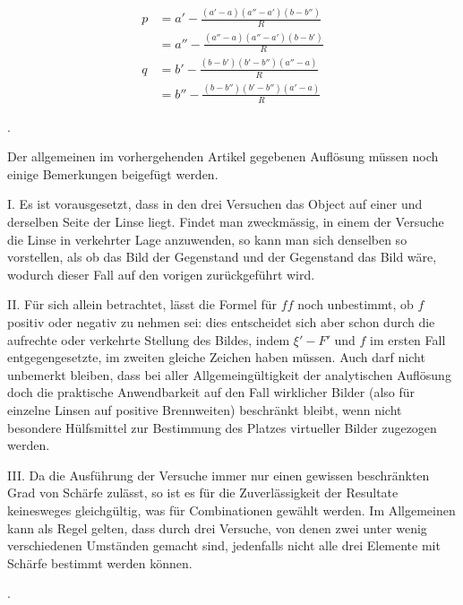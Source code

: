 \documentclass[11pt,a4paper]{article}
\begin{document}
\newpage
\noindent
\begin{align*}
p &= a' - \frac{(a' - a)(a'' - a')(b - b'')}{R} \\
  &= a'' - \frac{(a'' - a)(a'' - a')(b - b')}{R} \\
q &= b' - \frac{(b - b')(b' - b'')(a'' - a)}{R} \\
  &= b'' - \frac{(b - b'')(b' - b'')(a' - a)}{R}
\end{align*}

\bigskip{}.

\smallskip
Der allgemeinen im vorhergehenden Artikel gegebenen Auflösung müssen noch einige Bemerkungen beigefügt werden.

I. Es ist vorausgesetzt, dass in den drei Versuchen das Object auf einer und derselben Seite der Linse liegt. Findet man zweckmässig, in einem der Versuche die Linse in verkehrter Lage anzuwenden, so kann man sich denselben so vorstellen, als ob das Bild der Gegenstand und der Gegenstand das Bild wäre, wodurch dieser Fall auf den vorigen zurückgeführt wird.

II. Für sich allein betrachtet, lässt die Formel für $ff$ noch unbestimmt, ob $f$ positiv oder negativ zu nehmen sei: dies entscheidet sich aber schon durch die aufrechte oder verkehrte Stellung des Bildes, indem $\xi' - F'$ und $f$ im ersten Fall entgegengesetzte, im zweiten gleiche Zeichen haben müssen. Auch darf nicht unbemerkt bleiben, dass bei aller Allgemeingültigkeit der analytischen Auflösung doch die praktische Anwendbarkeit auf den Fall wirklicher Bilder (also für einzelne Linsen auf positive Brennweiten) beschränkt bleibt, wenn nicht besondere Hülfsmittel zur Bestimmung des Platzes virtueller Bilder zugezogen werden.

III. Da die Ausführung der Versuche immer nur einen gewissen beschränkten Grad von Schärfe zulässt, so ist es für die Zuverlässigkeit der Resultate keinesweges gleichgültig, was für Combinationen gewählt werden. Im Allgemeinen kann als Regel gelten, dass durch drei Versuche, von denen zwei unter wenig verschiedenen Umständen gemacht sind, jedenfalls nicht alle drei Elemente mit Schärfe bestimmt werden können.

\bigskip{}.
\end{document}
